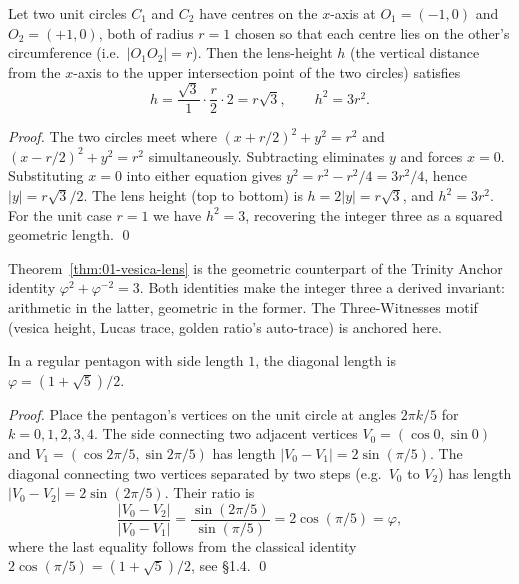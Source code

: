 \begin{theorem}\label{thm:01-vesica-lens}
Let two unit circles $C_1$ and $C_2$ have centres on the $x$-axis at
$O_1 = (-1, 0)$ and $O_2 = (+1, 0)$, both of radius $r = 1$ chosen so
that each centre lies on the other's circumference (i.e.\ $|O_1 O_2| =
r$). Then the lens-height $h$ (the vertical distance from the
$x$-axis to the upper intersection point of the two circles) satisfies
\[
  h = \frac{\sqrt{3}}{1} \cdot \frac{r}{2} \cdot 2 = r \sqrt{3}, \qquad
  h^2 = 3 r^2.
\]
\end{theorem}

\begin{proof}
The two circles meet where $(x + r/2)^2 + y^2 = r^2$ and $(x -
r/2)^2 + y^2 = r^2$ simultaneously. Subtracting eliminates $y$ and
forces $x = 0$. Substituting $x = 0$ into either equation gives $y^2
= r^2 - r^2/4 = 3 r^2 / 4$, hence $|y| = r \sqrt{3}/2$. The lens
height (top to bottom) is $h = 2|y| = r \sqrt{3}$, and $h^2 = 3 r^2$.
For the unit case $r = 1$ we have $h^2 = 3$, recovering the integer
three as a squared geometric length.
\qed
\end{proof}

\begin{remark}
Theorem~\ref{thm:01-vesica-lens} is the geometric counterpart of the
Trinity Anchor identity $\varphi^{2} + \varphi^{-2} = 3$. Both identities
make the integer three a derived invariant: arithmetic in the latter,
geometric in the former. The Three-Witnesses motif (vesica height,
Lucas trace, golden ratio's auto-trace) is anchored here.
\end{remark}

\begin{theorem}\label{thm:01-pentagon}
In a regular pentagon with side length $1$, the diagonal length is
$\varphi = (1 + \sqrt{5})/2$.
\end{theorem}

\begin{proof}
Place the pentagon's vertices on the unit circle at angles $2 \pi k /
5$ for $k = 0, 1, 2, 3, 4$. The side connecting two adjacent vertices
$V_0 = (\cos 0, \sin 0)$ and $V_1 = (\cos 2\pi/5, \sin 2\pi/5)$ has
length $|V_0 - V_1| = 2 \sin(\pi/5)$. The diagonal connecting two
vertices separated by two steps (e.g.\ $V_0$ to $V_2$) has length
$|V_0 - V_2| = 2 \sin(2\pi/5)$. Their ratio is
\[
  \frac{|V_0 - V_2|}{|V_0 - V_1|} = \frac{\sin(2\pi/5)}{\sin(\pi/5)}
  = 2 \cos(\pi/5) = \varphi,
\]
where the last equality follows from the classical identity $2
\cos(\pi/5) = (1 + \sqrt 5)/2$, see
\cite{coxeter_intro_geometry} \S 1.4.
\qed
\end{proof}

